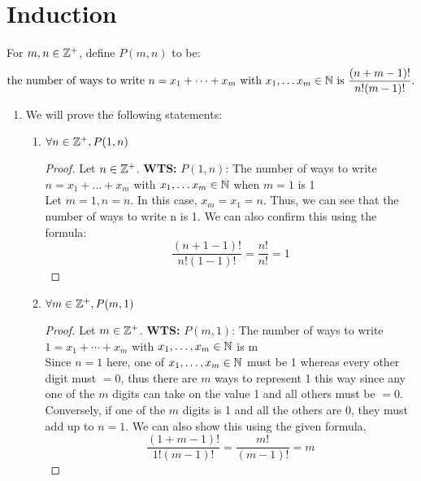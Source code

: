 \documentclass[12pt]{article}
\theoremstyle{definition}
\begin{document}
\newpage
\section{Induction}
\setcounter{equation}{0}
For $m, n \in \mathbb Z^+$, define $P(m, n)$ to be:
\begin{align*}
    \text{the number of ways to write $n=x_1 + \dots + x_m$ with $x_1, \dots x_m \in \mathbb N$ is $\frac{(n+m-1)!}{n!(m-1)!}$}.
\end{align*}

\begin{enumerate}
    \item We will prove the following statements:
    
    \begin{enumerate}[i]
    
        \item $\forall n \in \mathbb Z^+, P(1, n)$
            \begin{proof}
                Let $n \in \mathbb Z^+$. \textbf{WTS:} $P(1, n)$: The number of ways to write $n = x_{1} + \ldots + x_{m}$ with $x_1, \dots x_m \in \mathbb N$ when $ m = 1$ is 1 \\ 
                Let $m = 1, n = n$. In this case, $x_m = x_1 = n$. Thus, we can see that the number of ways to write n is 1. We can also confirm this using the formula:
                $$\frac{(n+1-1)!}{n!(1-1)!} = \frac{n!}{n!} = 1$$
            \end{proof}
        
        \item $\forall m \in \mathbb Z^+, P(m, 1)$
            \begin{proof}
                Let $m \in \mathbb Z^+$. \textbf{WTS:} $P(m, 1)$: The number of ways to write $1 = x_1 + \cdots + x_m$ with $x_1, \ldots, x_m \in \mathbb N$ is m \\
                Since $n = 1$ here, one of $x_1, \ldots, x_m \in \mathbb N$ must be 1 whereas every other digit must $ = 0$, thus there are $m$ ways to represent 1 this way since any one of the $m$ digits can take on the value 1 and all others must be $=0$. Conversely, if one of the $m$ digits is 1 and all the others are $0$, they must add up to $n = 1$. We can also show this using the given formula, \\
                $$\frac{(1+m-1)!}{1!(m-1)!} = \frac{m!}{(m-1)!} = m$$
            \end{proof}
            

\end{enumerate}
\end{enumerate}
\end{document}
